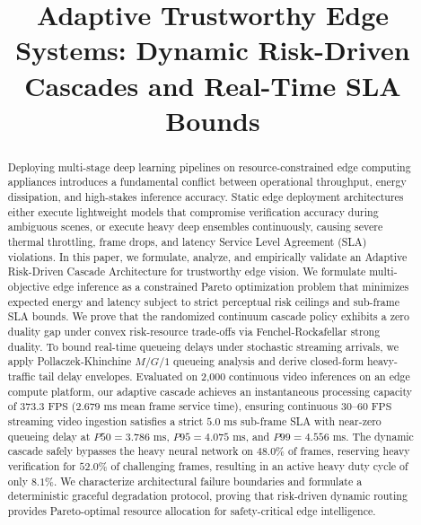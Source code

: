 \documentclass[conference]{IEEEtran}
\begin{document}
\title{Adaptive Trustworthy Edge Systems: Dynamic Risk-Driven Cascades and Real-Time SLA Bounds}

\author{
}

\maketitle

\begin{abstract}
Deploying multi-stage deep learning pipelines on resource-constrained edge computing appliances introduces a fundamental conflict between operational throughput, energy dissipation, and high-stakes inference accuracy. Static edge deployment architectures either execute lightweight models that compromise verification accuracy during ambiguous scenes, or execute heavy deep ensembles continuously, causing severe thermal throttling, frame drops, and latency Service Level Agreement (SLA) violations. In this paper, we formulate, analyze, and empirically validate an Adaptive Risk-Driven Cascade Architecture for trustworthy edge vision. We formulate multi-objective edge inference as a constrained Pareto optimization problem that minimizes expected energy and latency subject to strict perceptual risk ceilings and sub-frame SLA bounds. We prove that the randomized continuum cascade policy exhibits a zero duality gap under convex risk-resource trade-offs via Fenchel-Rockafellar strong duality. To bound real-time queueing delays under stochastic streaming arrivals, we apply Pollaczek-Khinchine $M/G/1$ queueing analysis and derive closed-form heavy-traffic tail delay envelopes. Evaluated on 2,000 continuous video inferences on an edge compute platform, our adaptive cascade achieves an instantaneous processing capacity of $373.3\text{ FPS}$ ($2.679\text{ ms}$ mean frame service time), ensuring continuous $30\text{--}60\text{ FPS}$ streaming video ingestion satisfies a strict $5.0\text{ ms}$ sub-frame SLA with near-zero queueing delay at $P50 = 3.786\text{ ms}$, $P95 = 4.075\text{ ms}$, and $P99 = 4.556\text{ ms}$. The dynamic cascade safely bypasses the heavy neural network on $48.0\%$ of frames, reserving heavy verification for $52.0\%$ of challenging frames, resulting in an active heavy duty cycle of only $8.1\%$. We characterize architectural failure boundaries and formulate a deterministic graceful degradation protocol, proving that risk-driven dynamic routing provides Pareto-optimal resource allocation for safety-critical edge intelligence.
\end{abstract}
\end{document}
